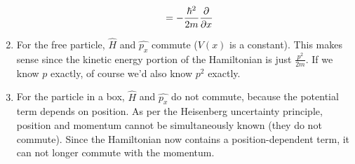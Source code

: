 \begin{solution}
\begin{enumerate}
\begin{enumerate}
\begin{align*}
                                              & =-\frac{\hbar^2}{2m}\frac{\partial }{\partial x}
                        \end{align*}
              \end{enumerate}
        \item For the free particle, $\hat{H}$ and $\hat{p_x}$ commute ($V(x)$ is a constant). This makes sense since
              the kinetic energy portion of the Hamiltonian is just $\frac{p^2}{2m}$. If we know $p$ exactly, of course we'd
              also know $p^2$ exactly.
        \item For the particle in a box, $\hat{H}$ and $\hat{p_x}$ do not commute, because the potential term depends
              on position. As per the Heisenberg uncertainty principle, position and momentum cannot be simultaneously
              known (they do not commute). Since the Hamiltonian now contains a position-dependent term, it can not longer
              commute with the momentum.
    \end{enumerate}
\end{solution}
